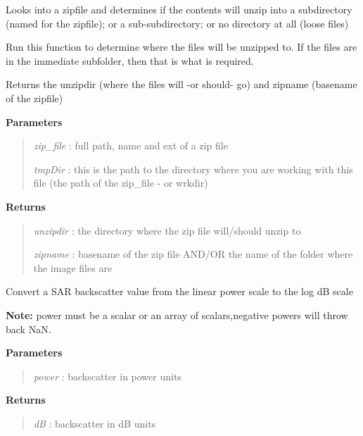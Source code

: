 \documentclass[letterpaper,10pt,openany,oneside]{sphinxmanual}
\begin{document}
\begin{fulllineitems}
\label{code:Util.getZipRoot}
Looks into a zipfile and determines if the contents will unzip into a subdirectory
(named for the zipfile); or a sub-subdirectory; or no directory at all (loose files)

Run this function to determine where the files will be unzipped to. If the files are in
the immediate subfolder, then that is what is required.

Returns the unzipdir (where the files will -or should- go) and zipname (basename of the zipfile)

\textbf{Parameters}
\begin{quote}

\emph{zip\_file} : full path, name and ext of a zip file

\emph{tmpDir}   : this is the path to the directory where you are working with this file (the path of the zip\_file - or wrkdir)
\end{quote}

\textbf{Returns}
\begin{quote}

\emph{unzipdir} : the directory where the zip file will/should unzip to

\emph{zipname}  : basename of the zip file AND/OR the name of the folder where the image files are
\end{quote}

\end{fulllineitems}


\begin{fulllineitems}
\label{code:Util.getdBScale}
Convert a SAR backscatter value from the linear power scale to the log dB scale

\textbf{Note:} power must be a scalar or an array of scalars,negative powers will throw back NaN.

\textbf{Parameters}
\begin{quote}

\emph{power} : backscatter in power units
\end{quote}

\textbf{Returns}
\begin{quote}

\emph{dB}    : backscatter in dB units
\end{quote}

\end{fulllineitems}
\end{document}
